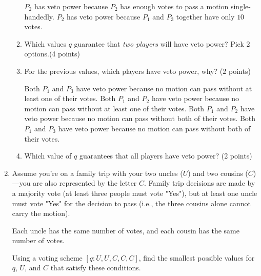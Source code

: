 \documentclass[12pt]{exam}
\begin{document}
\begin{enumerate}
\begin{enumerate}
\begin{checkboxes}
    \choice $P_2$ has veto power because $P_2$ has enough votes to pass a motion single-handedly.
    \choice $P_2$ has veto power because $P_1$ and $P_3$ together have only $10$ votes.
\end{checkboxes}
\vfill
\item Which values $q$ guarantee that \emph{two players} will have veto power? Pick 2 options.(4 points)
\begin{checkboxes}
\end{checkboxes}
\vfill
\item For the previous values, which players have veto power, why? (2 points)
\begin{checkboxes}
    \choice Both $P_1$ and $P_3$ have veto power because no motion can pass without at least one of their votes. 
    \choice Both $P_1$ and $P_2$ have veto power because no motion can pass without at least one of their votes. 
    \choice Both $P_1$ and $P_2$ have veto power because no motion can pass without both of their votes. 
    \choice Both $P_1$ and $P_3$ have veto power because no motion can pass without both of their votes. 
\end{checkboxes}
\vfill
\item Which value of $q$ guarantees that all players have veto power? (2 points)
\begin{checkboxes}
\end{checkboxes}
\end{enumerate}
\vfill

\newpage

\item Assume you're on a family trip with your two uncles ($U$) and two cousins ($C$)—you are also represented by the letter $C$. Family trip decisions are made by a majority vote (at least three people must vote "Yes"), but at least one uncle must vote "Yes" for the decision to pass (i.e., the three cousins alone cannot carry the motion).  

Each uncle has the same number of votes, and each cousin has the same number of votes.  

Using a voting scheme $[q: U, U, C, C, C]$, find the smallest possible values for $q$, $U$, and $C$ that satisfy these conditions.





\end{enumerate}
\end{document}
